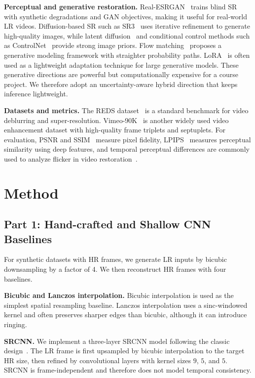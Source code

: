 \documentclass[10pt,twocolumn,letterpaper]{article}
\begin{document}
\textbf{Perceptual and generative restoration.}
Real-ESRGAN~\cite{wang2021realesrgan} trains blind SR with synthetic degradations and GAN objectives, making it useful for real-world LR videos. Diffusion-based SR such as SR3~\cite{saharia2022sr3} uses iterative refinement to generate high-quality images, while latent diffusion~\cite{rombach2022ldm} and conditional control methods such as ControlNet~\cite{zhang2023controlnet} provide strong image priors. Flow matching~\cite{lipman2023flowmatching} proposes a generative modeling framework with straighter probability paths. LoRA~\cite{hu2022lora} is often used as a lightweight adaptation technique for large generative models. These generative directions are powerful but computationally expensive for a course project. We therefore adopt an uncertainty-aware hybrid direction that keeps inference lightweight.

\textbf{Datasets and metrics.}
The REDS dataset~\cite{nah2019reds} is a standard benchmark for video deblurring and super-resolution. Vimeo-90K~\cite{xue2019vimeo90k} is another widely used video enhancement dataset with high-quality frame triplets and septuplets. For evaluation, PSNR and SSIM~\cite{wang2004ssim} measure pixel fidelity, LPIPS~\cite{zhang2018lpips} measures perceptual similarity using deep features, and temporal perceptual differences are commonly used to analyze flicker in video restoration~\cite{chu2020tlpips}.

\section{Method}
\subsection{Part 1: Hand-crafted and Shallow CNN Baselines}
For synthetic datasets with HR frames, we generate LR inputs by bicubic downsampling by a factor of 4. We then reconstruct HR frames with four baselines.

\textbf{Bicubic and Lanczos interpolation.}
Bicubic interpolation is used as the simplest spatial resampling baseline. Lanczos interpolation uses a sinc-windowed kernel and often preserves sharper edges than bicubic, although it can introduce ringing.

\textbf{SRCNN.}
We implement a three-layer SRCNN model following the classic design~\cite{dong2015srcnn}. The LR frame is first upsampled by bicubic interpolation to the target HR size, then refined by convolutional layers with kernel sizes $9$, $5$, and $5$. SRCNN is frame-independent and therefore does not model temporal consistency.
\end{document}
